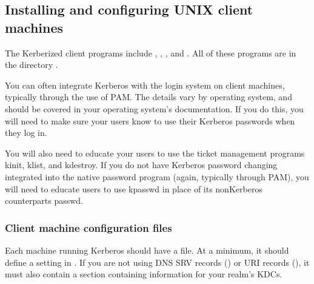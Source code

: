 \documentclass[letterpaper,10pt,english]{sphinxmanual}
\begin{document}
\sphinxstepscope


\subsection{Installing and configuring UNIX client machines}
\label{\detokenize{admin/install_clients:installing-and-configuring-unix-client-machines}}\label{\detokenize{admin/install_clients::doc}}
\sphinxAtStartPar
The Kerberized client programs include ,
, , and .  All of
these programs are in the directory {\hyperref[\detokenize{mitK5defaults:paths}]{}}.

\sphinxAtStartPar
You can often integrate Kerberos with the login system on client
machines, typically through the use of PAM.  The details vary by
operating system, and should be covered in your operating system’s
documentation.  If you do this, you will need to make sure your users
know to use their Kerberos passwords when they log in.

\sphinxAtStartPar
You will also need to educate your users to use the ticket management
programs kinit, klist, and kdestroy.  If you do not have Kerberos
password changing integrated into the native password program (again,
typically through PAM), you will need to educate users to use kpasswd
in place of its non\sphinxhyphen{}Kerberos counterparts passwd.


\subsubsection{Client machine configuration files}
\label{\detokenize{admin/install_clients:client-machine-configuration-files}}
\sphinxAtStartPar
Each machine running Kerberos should have a {\hyperref[\detokenize{admin/conf_files/krb5_conf:krb5-conf-5}]{}} file.
At a minimum, it should define a  setting in
{\hyperref[\detokenize{admin/conf_files/krb5_conf:libdefaults}]{}}.  If you are not using DNS SRV records
({\hyperref[\detokenize{admin/realm_config:kdc-hostnames}]{}}) or URI records ({\hyperref[\detokenize{admin/realm_config:kdc-discovery}]{}}), it must
also contain a {\hyperref[\detokenize{admin/conf_files/krb5_conf:realms}]{}} section containing information for your
realm’s KDCs.
\end{document}
